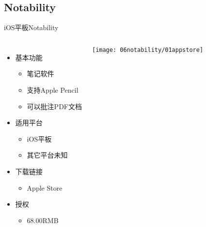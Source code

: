 \documentclass[fontset = none, t, aspectratio=169]{ctexbeamer}
\begin{document}
\subsection{Notability}
\begin{frame}{iOS平板}{Notability}
  \begin{columns}[c]
    \begin{itemize}\itemsep=3pt
    \item 基本功能
      \begin{itemize}
      \item 笔记软件
      \item 支持Apple Pencil
      \item 可以\alert{批注}PDF文档
      \end{itemize}
    \item 适用平台
      \begin{itemize}
      \item iOS平板
      \item 其它平台未知
      \end{itemize}
    \item 下载链接
      \begin{itemize}
      \item Apple Store
      \end{itemize}
    \item 授权
      \begin{itemize}
      \item \alert{68.00RMB}
      \end{itemize}
    \end{itemize}
    \texttt{[image: 06notability/01appstore]}
  \end{columns}
\end{frame}
\end{document}
